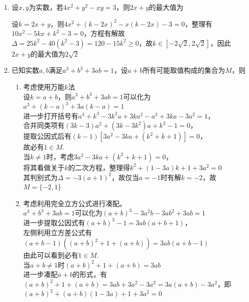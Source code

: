 \begin{enumerate}
\begin{enumerate}
\begin{jieda}
        \end{jieda}
        \item 设$x, y$为实数，若$4x^2 + y^2 -xy = 3$，则$2x+y$的最大值为
        \begin{jieda}
            设$k = 2x+y$，则$4x^2 + (k-2x)^2 - x(k-2x) - 3 = 0$，整理有$10x^2 - 5kx + k^2 -3 = 0$，方程有解故$\Delta = 25k^2 - 40(k^2-3) = 120-15k^2 \geq 0$，故$k \in [-2\sqrt{2}, 2\sqrt{2}]$，因此$2x+y$的最大值为$2\sqrt{2}$
        \end{jieda}
        \item 已知实数$a, b$满足$a^3 + b^3 + 3ab = 1$，设$a+b$所有可能取值构成的集合为$M$，则
        \begin{jieda}
            \begin{enumerate}
                \item 考虑使用万能$k$法 \\
                设$k = a+b$，则$a^3 + b^3 + 3ab = 1$可以化为$a^3 + (k-a)^3 + 3a(k-a) = 1$ \\
                进一步打开括号有$a^3 + k^3 - 3k^2a + 3ka^2 - a^3 + 3ka - 3a^2 = 1$，\\
                合并同类项有$(3k-3)a^2 + (3k-3k^2)a + k^3 - 1 = 0$，\\
                提取公因式后有$(k-1)[3a^2 - 3ka + (k^2+k+1)] = 0$，\\
                故必有$1 \in M$.\\
                当$k \neq 1$时，考虑$3a^2 - 3ka + (k^2+k+1) = 0$，\\
                将其看做关于$k$的二次方程，整理得$k^2 + (1-3a)k + 1 + 3a^2 = 0$ \\
                其判别式为$\Delta = -3(a+1)^2$，故仅当$a = -1$时有解$k = -2$，故$M = \{-2, 1\}$
                \item 考虑利用完全立方公式进行凑配。\\
                $a^3 + b^3 + 3ab = 1$可以化为$(a+b)^3 -3a^2b - 3ab^2 + 3ab = 1$ \\
                进一步提取公因式有$(a+b)^3 - 1 = 3ab(a+b+1)$，\\
                左侧利用立方差公式有$(a+b-1)((a+b)^2+1+(a+b)) = 3ab(a+b-1)$ \\
                由此可以看到必有$1 \in M$.\\
                当$a+b \neq 1$时$(a+b)^2+1+(a+b) = 3ab$ \\
                进一步凑配$a+b$的形式，有$(a+b)^2+1+(a+b) = 3ab + 3a^2 - 3a^2 = 3a(a+b) - 3a^2$，即$(a+b)^2+(a+b)(1-3a)+1+3a^2 = 0$\\

\end{enumerate}
\end{jieda}
\end{enumerate}
\end{enumerate}
